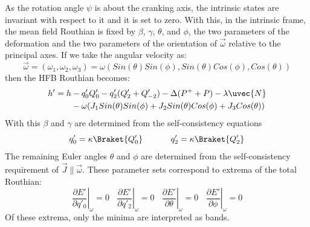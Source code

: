As the rotation angle $\psi$ is about the cranking axis, the intrinsic states are invariant with respect to it and it is set to zero. With this, in the intrinsic frame, the mean field Routhian is fixed by $\beta$, $\gamma$, $\theta$, and $\phi$, the two parameters of the deformation and the two parameters of the orientation of $\vec{\omega}$ relative to the principal axes. If we take the angular velocity as:
\begin{equation}
\label{eqn:chp2-ang-vel-vec}
\vec{\omega}=(\omega_1,\omega_2,\omega_3)=\omega(Sin(\theta)Sin(\phi),Sin(\theta)Cos(\phi),Cos(\theta))
\end{equation}
then the HFB Routhian becomes:
\begin{align}
\label{eqn:chp2-TAC-HFB-intrin-routh-rewrite}
h'=h& -q'_0Q'_0-q'_2(Q'_2+Q'_{-2})-\Delta(P^++P)-\lambda\uvec{N} \\
&- \omega(J_1Sin(\theta)Sin(\phi)+J_2Sin(\theta)Cos(\phi)+J_3Cos(\theta)) \nonumber
\end{align}
With this $\beta$ and $\gamma$ are determined from the self-consistency equations
\begin{equation}
\label{eqn:chp2-TAC-beta-gamma-self-consist}
q'_0=\kappa\Braket{Q'_0}~~~~~~~~~~q'_2=\kappa\Braket{Q'_2}
\end{equation}
The remaining Euler angles $\theta$ and $\phi$ are determined from the self-consistency requirement of $\vec{J}\parallel\vec{\omega}$. These parameter sets correspond to extrema of the total Routhian:
\begin{equation}
\label{eqn:chp2-tac-extrema-cond2}
\left. \frac{\partial{}E'}{\partial{}q'_{0}} \right|_{\omega}=0 ~~~~ \left. \frac{\partial{}E'}{\partial{}q'_{2}} \right|_{\omega}=0 ~~~~ \left. \frac{\partial{}E'}{\partial\theta} \right|_{\omega}=0 ~~~~ \left. \frac{\partial{}E'}{\partial\phi} \right|_{\omega}=0
\end{equation}
Of these extrema, only the minima are interpreted as bands.

